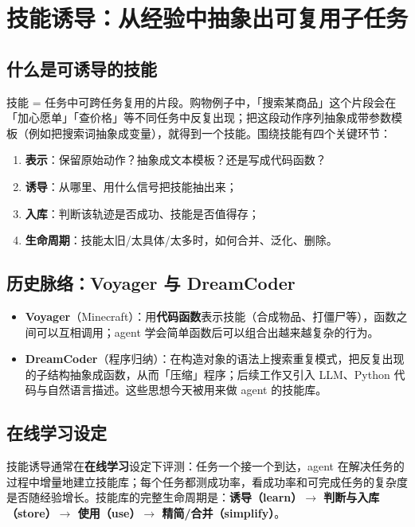 ﻿\documentclass[a4paper]{article}
\begin{document}
\section{技能诱导：从经验中抽象出可复用子任务}

\subsection{什么是可诱导的技能}

技能 = 任务中可跨任务复用的片段。购物例子中，「搜索某商品」这个片段会在「加心愿单」「查价格」等不同任务中反复出现；把这段动作序列抽象成带参数模板（例如把搜索词抽象成变量），就得到一个技能。围绕技能有四个关键环节：

\begin{enumerate}
\item \textbf{表示}：保留原始动作？抽象成文本模板？还是写成代码函数？
\item \textbf{诱导}：从哪里、用什么信号把技能抽出来；
\item \textbf{入库}：判断该轨迹是否成功、技能是否值得存；
\item \textbf{生命周期}：技能太旧/太具体/太多时，如何合并、泛化、删除。
\end{enumerate}

\subsection{历史脉络：Voyager 与 DreamCoder}

\begin{itemize}
\item \textbf{Voyager}（Minecraft）：用\textbf{代码函数}表示技能（合成物品、打僵尸等），函数之间可以互相调用；agent 学会简单函数后可以组合出越来越复杂的行为。
\item \textbf{DreamCoder}（程序归纳）：在构造对象的语法上搜索重复模式，把反复出现的子结构抽象成函数，从而「压缩」程序；后续工作又引入 LLM、Python 代码与自然语言描述。这些思想今天被用来做 agent 的技能库。
\end{itemize}

\subsection{在线学习设定}

技能诱导通常在\textbf{在线学习}设定下评测：任务一个接一个到达，agent 在解决任务的过程中增量地建立技能库；每个任务都测成功率，看成功率和可完成任务的复杂度是否随经验增长。技能库的完整生命周期是：\textbf{诱导（learn）$\rightarrow$ 判断与入库（store）$\rightarrow$ 使用（use）$\rightarrow$ 精简/合并（simplify）}。
\end{document}
